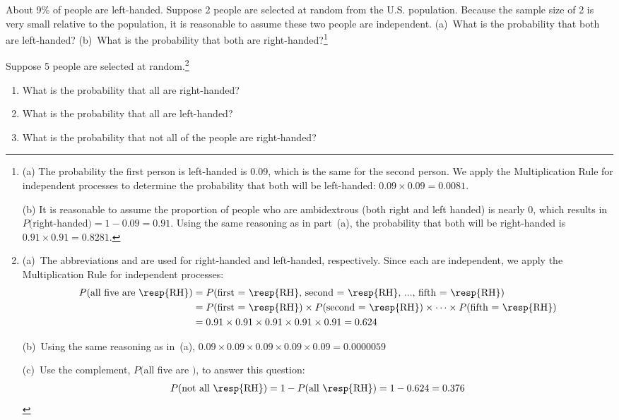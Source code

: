 \begin{exercise} \label{ex2Handedness}
About 9\% of people are left-handed. Suppose 2 people are selected at random from the U.S. population. Because the sample size of 2 is very small relative to the population, it is reasonable to assume these two people are independent. (a)~What is the probability that both are left-handed? (b)~What is the probability that both are right-handed?\footnote{(a) The probability the first person is left-handed is $0.09$, which is the same for the second person. We apply the Multiplication Rule for independent processes to determine the probability that both will be left-handed: $0.09\times 0.09 = 0.0081$.

(b) It is reasonable to assume the proportion of people who are ambidextrous (both right and left handed) is nearly 0, which results in $P($right-handed$)=1-0.09=0.91$. Using the same reasoning as in part~(a), the probability that both will be right-handed is $0.91\times 0.91 = 0.8281$.}
\end{exercise}

\textC{\newpage}

\begin{exercise} \label{ex5Handedness}
Suppose 5 people are selected at random.\footnote{(a)~The abbreviations  and  are used for right-handed and left-handed, respectively. Since each are independent, we apply the Multiplication Rule for independent processes:
\begin{align*}
P(\text{all five are \resp{RH}})
&= P(\text{first = \resp{RH}, second = \resp{RH}, ..., fifth = \resp{RH}}) \\
&= P(\text{first = \resp{RH}})\times P(\text{second = \resp{RH}})\times  \dots \times P(\text{fifth = \resp{RH}}) \\
&= 0.91\times 0.91\times 0.91\times 0.91\times 0.91 = 0.624
\end{align*}

(b)~Using the same reasoning as in~(a), $0.09\times 0.09\times 0.09\times 0.09\times 0.09 = 0.0000059$

(c)~Use the complement, $P($all five are $)$, to answer this question:
\begin{align*}
P(\text{not all \resp{RH}})
	= 1 - P(\text{all \resp{RH}})
	= 1 - 0.624 = 0.376
\end{align*}} \vspace{-1.5mm}
\begin{enumerate}
\setlength{\itemsep}{0mm}
\item[(a)] What is the probability that all are right-handed?
\item[(b)] What is the probability that all are left-handed?
\item[(c)] What is the probability that not all of the people are right-handed?
\end{enumerate}
\end{exercise}

